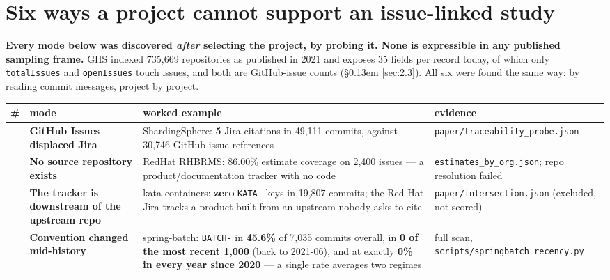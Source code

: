 \documentclass[sigconf,review,anonymous]{acmart}
\begin{document}
\section{Six ways a project cannot support an issue-linked study}
\label{sec:5}

\textbf{Every mode below was discovered \emph{after} selecting the project, by probing it. None is expressible in any published sampling frame.} GHS indexed 735,669 repositories as published in 2021 and exposes 35 fields per record today, of which only \texttt{totalIssues} and \texttt{openIssues} touch issues, and both are GitHub-issue counts (\S\kern0.13em \ref{sec:2.3}). All six were found the same way: by reading commit messages, project by project.

\begin{table}[htbp]
\centering
\begingroup\footnotesize\setlength{\tabcolsep}{3pt}
\begin{tabular}{>{\raggedright\arraybackslash}p{}>{\raggedright\arraybackslash}p{}>{\raggedright\arraybackslash}p{}>{\raggedright\arraybackslash}p{}}
\toprule
\textbf{\#} & \textbf{mode} & \textbf{worked example} & \textbf{evidence} \\
\midrule
1 & \textbf{GitHub Issues displaced Jira} & ShardingSphere: \textbf{5} Jira citations in 49,111 commits, against 30,746 GitHub-\allowbreak{}issue references & \texttt{paper/\allowbreak{}traceability\_\allowbreak{}probe.\allowbreak{}json} \\
2 & \textbf{No source repository exists} & RedHat RHBRMS: 86.00\% estimate coverage on 2,400 issues --- a product/\allowbreak{}documentation tracker with no code & \texttt{estimates\_\allowbreak{}by\_\allowbreak{}org.\allowbreak{}json}; repo resolution failed \\
3 & \textbf{The tracker is downstream of the upstream repo} & kata-\allowbreak{}containers: \textbf{zero} \texttt{KATA-\allowbreak{}} keys in 19,807 commits; the Red Hat Jira tracks a product built from an upstream nobody asks to cite & \texttt{paper/\allowbreak{}intersection.\allowbreak{}json} (excluded, not scored) \\
4 & \textbf{Convention changed mid-\allowbreak{}history} & spring-\allowbreak{}batch: \texttt{BATCH-\allowbreak{}} in \textbf{45.6\%} of 7,035 commits overall, in \textbf{0 of the most recent 1,000} (back to 2021-06), and at exactly \textbf{0\% in every year since 2020} --- a single rate averages two regimes & full scan, \texttt{scripts/\allowbreak{}springbatch\_\allowbreak{}recency.\allowbreak{}py} \\

\end{tabular}
\end{table}
\end{document}

